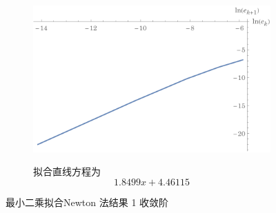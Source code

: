\documentclass[11pt]{article}
\begin{document}
\begin{figure}[h]
\begin{subfigure}{\textwidth}
{\begin{tabular}{|c|c|c|c|c|}
            \hline
        \end{tabular}
        }
        \label{table:Newton-LS1}
    \end{subfigure}
    \begin{subfigure}{.49\textwidth}
        \centering
        \includegraphics[scale = 0.5]{Figure/收敛阶-Newton1.pdf}
        \label{figure:Newton-LS1}
    \end{subfigure}
    \begin{subfigure}{.49\textwidth}
        \centering
        拟合直线方程为
        \begin{equation*}
            1.8499 x + 4.46115
        \end{equation*}
    \end{subfigure}
    \caption{最小二乘拟合Newton 法结果 1 收敛阶}
    \label{Newton-LS1}
\end{figure}
\end{document}
